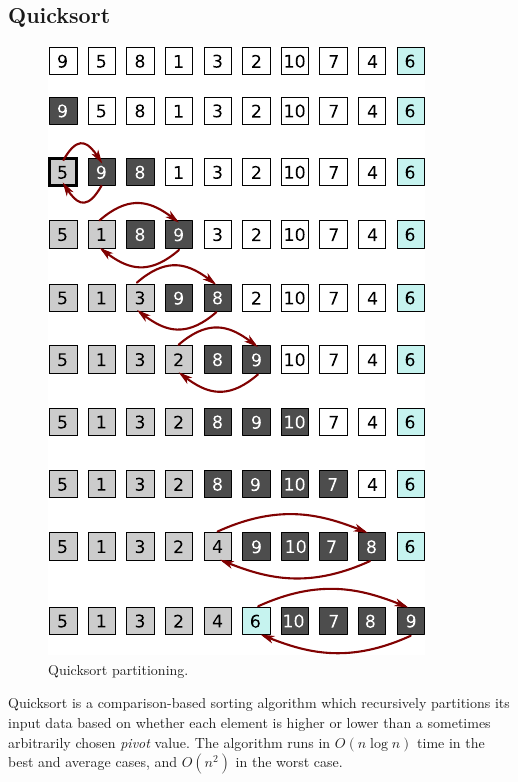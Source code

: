 \documentclass[12pt, a4paper]{article}
\begin{document}
\subsection{Quicksort}\label{sec:quicksort}

\begin{figure}
    \centering
    \includegraphics{quicksort.pdf}
    \caption{\label{fig:quicksort_1}Quicksort partitioning.}
\end{figure}

Quicksort is a comparison-based sorting algorithm which recursively partitions its input data based on whether each element is higher or lower than a sometimes arbitrarily chosen \emph{pivot} value. The algorithm runs in $O(n\log n)$ time in the best and average cases, and $O (n^{2})$ in the worst case.
\end{document}
